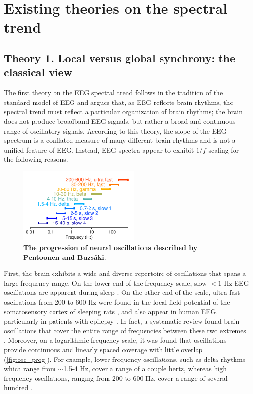 \section{Existing theories on the spectral trend} \label{sec:theories}

\subsection{Theory 1. Local versus global synchrony: the classical view} \label{sec:all_oscillations}

The first theory on the EEG spectral trend follows in the tradition of the standard model of EEG and argues that, as EEG reflects brain rhythms, the spectral trend must reflect a particular organization of brain rhythms; the brain does not produce broadband EEG signals, but rather a broad and continuous range of oscillatory signals. According to this theory, the slope of the EEG spectrum is a conflated measure of many different brain rhythms and is not a unified feature of EEG. Instead, EEG spectra appear to exhibit $1/f$ scaling for the following reasons.

\begin{figure}
\vspace{-10pt}
\centering
\includegraphics[width=60mm]{Figures/chapter1/rhythm_frequencies.pdf}
\caption[The progression of neural oscillations described by Pentoonen and Buzsáki]{\textbf{The progression of neural oscillations described by Pentoonen and Buzsáki}\cite{Penttonen2003}.}  \label{fig:osc_prog}
\end{figure}

First, the brain exhibits a wide and diverse repertoire of oscillations that spans a large frequency range. On the lower end of the frequency scale, slow $<1$ \unit{\hertz} EEG oscillations are apparent during sleep \cite{Achermann1997}. On the other end of the scale, ultra-fast oscillations from 200 to 600 Hz were found in the local field potential of the somatosensory cortex of sleeping rats \cite{Kandel1997}, and also appear in human EEG, particularly in patients with epilepsy \cite{Frauscher2017}. In fact, a systematic review found brain oscillations that cover the entire range of frequencies between these two extremes \cite{Penttonen2003}. Moreover, on a logarithmic frequency scale, it was found that oscillations provide continuous and linearly spaced coverage with little overlap (\autoref{fig:osc_prog}). For example, lower frequency oscillations, such as delta rhythms which range from $\sim$1.5-4 Hz, cover a range of a couple hertz, whereas high frequency oscillations, ranging from 200 to 600 Hz, cover a range of several hundred \cite{Penttonen2003}. 


